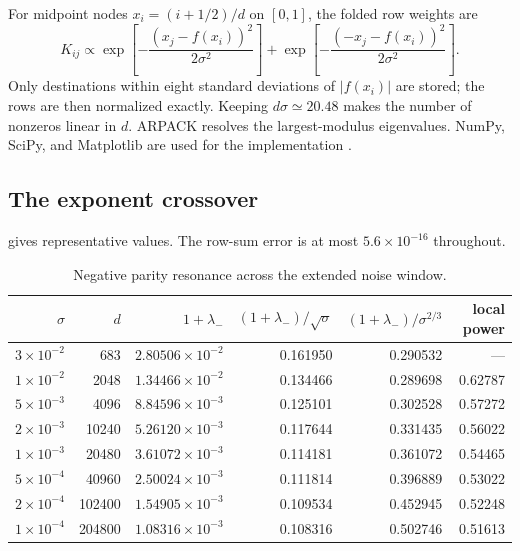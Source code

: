 \documentclass[11pt]{article}
\theoremstyle{definition}
\theoremstyle{remark}
\begin{document}
For midpoint nodes $x_i=(i+1/2)/d$ on $[0,1]$, the folded row weights are
\begin{equation}\label{eq:matrix-weights}
 K_{ij}\propto
 \exp\!\left[-\frac{(x_j-f(x_i))^2}{2\sigma^2}\right]
 +
 \exp\!\left[-\frac{(-x_j-f(x_i))^2}{2\sigma^2}\right].
\end{equation}
Only destinations within eight standard deviations of $|f(x_i)|$ are stored;
the rows are then normalized exactly.  Keeping $d\sigma\simeq20.48$ makes the
number of nonzeros linear in $d$.  ARPACK resolves the largest-modulus
eigenvalues.  NumPy, SciPy, and Matplotlib are used for the implementation
\citep{HarrisEtAl2020,VirtanenEtAl2020,Hunter2007}.

\subsection{The exponent crossover}

 gives representative values.  The row-sum error is at
most $5.6\times10^{-16}$ throughout.

\begin{table}[H]
\centering
\small
\caption{Negative parity resonance across the extended noise window.}
\label{tab:spectrum}
\begin{tabular}{rrrrrr}
\toprule
$\sigma$ & $d$ & $1+\lambda_-$
& $(1+\lambda_-)/\sqrt\sigma$
& $(1+\lambda_-)/\sigma^{2/3}$
& local power\\
\midrule
$3\!\times\!10^{-2}$ & 683    & $2.80506\times10^{-2}$ & 0.161950 & 0.290532 & ---\\
$1\!\times\!10^{-2}$ & 2048   & $1.34466\times10^{-2}$ & 0.134466 & 0.289698 & 0.62787\\
$5\!\times\!10^{-3}$ & 4096   & $8.84596\times10^{-3}$ & 0.125101 & 0.302528 & 0.57272\\
$2\!\times\!10^{-3}$ & 10240  & $5.26120\times10^{-3}$ & 0.117644 & 0.331435 & 0.56022\\
$1\!\times\!10^{-3}$ & 20480  & $3.61072\times10^{-3}$ & 0.114181 & 0.361072 & 0.54465\\
$5\!\times\!10^{-4}$ & 40960  & $2.50024\times10^{-3}$ & 0.111814 & 0.396889 & 0.53022\\
$2\!\times\!10^{-4}$ & 102400 & $1.54905\times10^{-3}$ & 0.109534 & 0.452945 & 0.52248\\
$1\!\times\!10^{-4}$ & 204800 & $1.08316\times10^{-3}$ & 0.108316 & 0.502746 & 0.51613\\
\bottomrule
\end{tabular}
\end{table}
\end{document}
